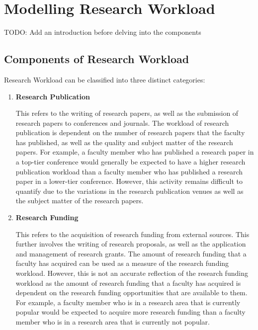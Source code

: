 \section{Modelling Research Workload}
\label{sec:modelling_research_workload}

TODO: Add an introduction before delving into the components

\subsection{Components of Research Workload}

Research Workload can be classified into three distinct categories:

\begin{enumerate}

  \item \textbf{Research Publication}

        This refers to the writing of research papers, as well as the submission of research papers to conferences and journals. The workload of research publication is dependent on the number of research papers that the faculty has published, as well as the quality and subject matter of the research papers. For example, a faculty member who has published a research paper in a top-tier conference would generally be expected to have a higher research publication workload than a faculty member who has published a research paper in a lower-tier conference. However, this activity remains difficult to quantify due to the variations in the research publication venues as well as the subject matter of the research papers.

  \item \textbf{Research Funding}

        This refers to the acquisition of research funding from external sources. This further involves the writing of research proposals, as well as the application and management of research grants. The amount of research funding that a faculty has acquired can be used as a measure of the research funding workload. However, this is not an accurate reflection of the research funding workload as the amount of research funding that a faculty has acquired is dependent on the research funding opportunities that are available to them. For example, a faculty member who is in a research area that is currently popular would be expected to acquire more research funding than a faculty member who is in a research area that is currently not popular.


\end{enumerate}
